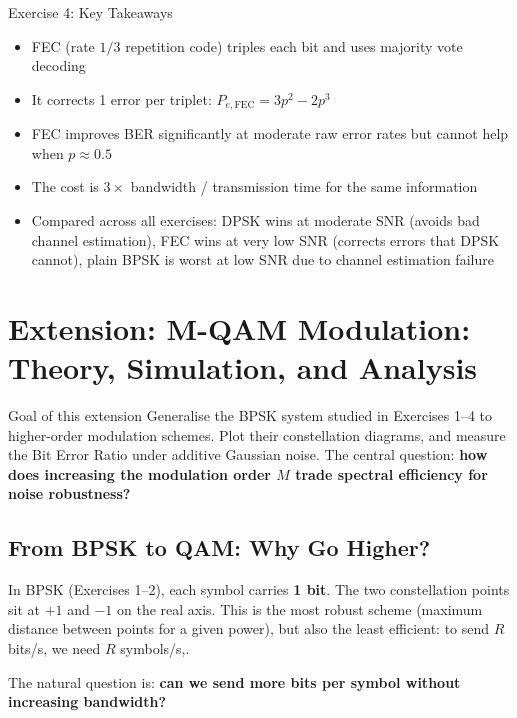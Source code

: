 \vspace{2cm}

\begin{SummaryBox}{Exercise 4: Key Takeaways}
\begin{itemize}
\item FEC (rate $1/3$ repetition code) triples each bit and uses majority vote decoding
\item It corrects 1 error per triplet: $P_{e,\text{FEC}} = 3p^2 - 2p^3$
\item FEC improves BER significantly at moderate raw error rates but cannot help when $p \approx 0.5$
\item The cost is $3\times$ bandwidth / transmission time for the same information
\item Compared across all exercises: DPSK wins at moderate SNR (avoids bad channel estimation), FEC wins at very low SNR (corrects errors that DPSK cannot), plain BPSK is worst at low SNR due to channel estimation failure
\end{itemize}
\end{SummaryBox}

\newpage
\section{Extension: M-QAM Modulation: Theory, Simulation, and Analysis}
\label{sec:extension-qam}

\begin{GoalBox}{Goal of this extension}
Generalise the BPSK system studied in Exercises 1--4 to higher-order modulation schemes. Plot their constellation diagrams, and measure the Bit Error Ratio under additive Gaussian noise. The central question: \textbf{how does increasing the modulation order $M$ trade spectral efficiency for noise robustness?}
\end{GoalBox}

\subsection{From BPSK to QAM: Why Go Higher?}

In BPSK (Exercises 1--2), each symbol carries \textbf{1 bit}. The two constellation points sit at $+1$ and $-1$ on the real axis. This is the most robust scheme (maximum distance between points for a given power), but also the least efficient: to send $R$ bits/s, we need $R$ symbols/s,.

The natural question is: \textbf{can we send more bits per symbol without increasing bandwidth?}

